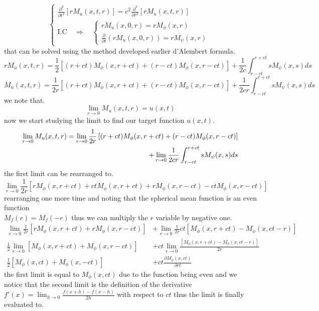 \[
    \begin{cases}
        \displaystyle \frac{\partial^2}{\partial t^2} \left[r M_u (x,t,r) \right] = c^2 \frac{\partial^2 }{\partial r^2}\left[r M_u (x,t,r) \right]    
        \\
        \text{I.C} \quad \Longrightarrow \quad 
        \begin{cases}
            rM_{u}(x,0,r) = rM_\phi(x,r)
            \\
            \frac{\partial}{\partial t}\left(rM_{u}(x,0,r)\right) = rM_\psi(x,r)
        \end{cases}
    \end{cases}
\]
that can be solved using the method developed earlier d'Alembert formula.
\[
    rM_u(x,t,r) = \frac{1}{2}\left[(r+ct)M_\phi(x,r+ct)+(r-ct)M_\phi(x,r-ct)\right]+\frac{1}{2c}\int_{r-ct}^{r+ct} sM_\psi(x,s)ds    
\]
\begin{equation}
M_u(x,t,r) = \frac{1}{2r}\left[(r+ct)M_\phi(x,r+ct)+(r-ct)M_\phi(x,r-ct)\right]+\frac{1}{2cr}\int_{r-ct}^{r+ct} sM_\psi(x,s)ds
\end{equation}
we note that.
\[
\lim_{r\to 0} M_u(x,t,r) = u(x,t)    
\]
now we start studying the limit to find our target function $u(x,t)$.
\begin{align}
\lim_{r\to 0} M_u(x,t,r) = \lim_{r\to 0}\frac{1}{2r}\left[(r+ct)M_\phi(x,r+ct)+(r-ct)M_\phi(x,r-ct)\right] \notag
\\
+\lim_{r\to 0}\frac{1}{2cr}\int_{r-ct}^{r+ct} sM_\psi(x,s)ds
\end{align}
the first limit can be rearranged to.
\[
    \lim_{r\to 0} \frac{1}{2r}\left[rM_\phi(x,r+ct)+ctM_\phi(x,r+ct)+rM_\phi(x,r-ct)-ctM_\phi(x,r-ct)\right]    
\]
rearranging one more time and noting that the spherical mean function is an even function 
\\
$\displaystyle M_f(r)=M_f(-r)$ thus we can multiply the $r$ variable by negative one.
\begin{align*}
    \lim_{r\to 0} \frac{1}{2r}\left[rM_\phi(x,r+ct)+rM_\phi(x,r-ct)\right] & +\lim_{r\to 0} \frac{1}{2r}ct\left[M_\phi(x,r+ct)-M_\phi(x,ct-r)\right]
    \\
    \frac{1}{2} \lim_{r\to 0} \left[M_\phi(x,r+ct)+M_\phi(x,r-ct)\right] & + ct \lim_{r\to 0} \frac{\left[M_\phi(x,r+ct)-M_\phi(x,ct-r)\right]}{2r}
    \\
    \frac{1}{2} \left[M_\phi(x,ct)+M_\phi(x,-ct)\right] & + ct \frac{\partial M_\phi(x,ct)}{\partial ct}
\end{align*}
the first limit is equal to $M_\phi(x,ct)$ due to the function being even and we notice that the second limit is the definition of the derivative$\displaystyle f'(x) = \lim_{h\to 0} \frac{f(x+h) - f(x-h)}{2h}$ with respect to $ct$ thus the limit is finally evaluated to.
